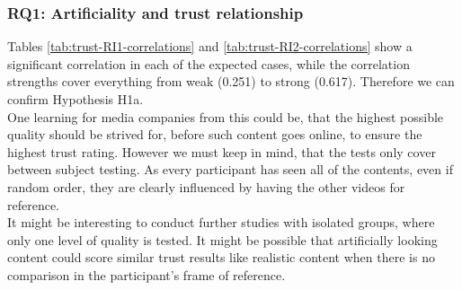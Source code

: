 \documentclass[
  a4paper,  %
  twoside,  %
  bibliography=totoc,
  headsepline,
  cleardoublepage=empty,
  parskip=half,
  draft=false
]{scrbook}
\begin{document}
\subsubsection{RQ1: Artificiality and trust relationship}
Tables \ref{tab:trust-RI1-correlations} and \ref{tab:trust-RI2-correlations} show a significant correlation in each of the expected cases, while the correlation strengths cover everything from weak (0.251) to strong (0.617). Therefore we can confirm Hypothesis H1a. \\
One learning for media companies from this could be, that the highest possible quality should be strived for, before such content goes online, to ensure the highest trust rating. However we must keep in mind, that the tests only cover between subject testing. As every participant has seen all of the contents, even if random order, they are clearly influenced by having the other videos for reference. \\
It might be interesting to conduct further studies with isolated groups, where only one level of quality is tested. It might be possible that artificially looking content could score similar trust results like realistic content when there is no comparison in the participant's frame of reference.
\end{document}
